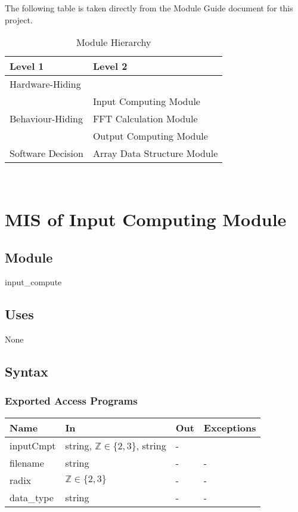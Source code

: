 \documentclass[12pt, titlepage]{article}
\begin{document}
The following table is taken directly from the Module Guide document for this project.

\begin{table}[h!]
\centering
\begin{tabular}{p{} p{}}
\toprule
\textbf{Level 1} & \textbf{Level 2}\\
\midrule

{Hardware-Hiding} & ~ \\
\midrule

\multirow{3}{0.3\textwidth}{Behaviour-Hiding}
& Input Computing Module\\
& FFT Calculation Module\\
& Output Computing Module\\
\midrule

\multirow{1}{0.3\textwidth}{Software Decision} & Array Data Structure Module\\
\bottomrule

\end{tabular}
\caption{Module Hierarchy}
\label{TblMH}
\end{table}

\newpage
~\newpage

\section{MIS of Input Computing Module} \label{Input} 

\subsection{Module}

input\_compute

\subsection{Uses}
None
\subsection{Syntax}

\subsubsection{Exported Access Programs}

\begin{center}
\begin{tabular}{p{2cm} p{4cm} p{4cm} p{2cm}}
\hline
\textbf{Name} & \textbf{In} & \textbf{Out} & \textbf{Exceptions} \\
\hline
inputCmpt & string, $\mathbb{Z}\in\{2, 3\}$, string& - & \\
filename& string & - & -\\
radix&$\mathbb{Z} \in \{2, 3\}$ & - & -\\
data\_type& string& -&-\\

\hline
\end{tabular}
\end{center}
\end{document}
